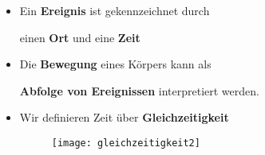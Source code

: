 \documentclass[]{beamer}%
\begin{document}
\begin{frame}
\begin{figure}[h]
    \end{figure}

\end{frame}

\begin{frame}
    \begin{itemize}
        \item Ein \textbf{Ereignis} ist gekennzeichnet durch\\
            \begin{center}
                einen \textbf{Ort} und eine \textbf{Zeit}
            \end{center}
    \end{itemize}
\end{frame}

\begin{frame}
    \begin{itemize}
        \item Die \textbf{Bewegung} eines Körpers kann als\\
            \begin{center}
                \textbf{Abfolge von Ereignissen} interpretiert werden.
            \end{center}
    \end{itemize}
\end{frame}


\begin{frame}
    \begin{itemize}
        \item   Wir definieren Zeit über \textbf{Gleichzeitigkeit}\\
            \vspace{5pt}
            \begin{figure}[h]
                    \centering
                    \texttt{[image: gleichzeitigkeit2]}\\
            \end{figure}
            \vspace{5pt}
    \end{itemize}
\end{frame}
\end{document}
